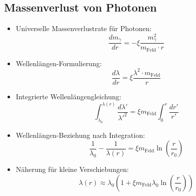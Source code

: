 \documentclass[12pt,a4paper]{article}
\begin{document}
\subsection{Massenverlust von Photonen}
\begin{itemize}
	\item Universelle Massenverlustrate für Photonen:
	\begin{equation}
		\boxed{\frac{dm_\gamma}{dr} = -\xi \frac{m_\gamma^2}{m_{\text{Feld}} \cdot r}}
	\end{equation}
	
	\item Wellenlängen-Formulierung:
	\begin{equation}
		\frac{d\lambda}{dr} = \xi \frac{\lambda^2 \cdot m_{\text{Feld}}}{r}
	\end{equation}
	
	\item Integrierte Wellenlängengleichung:
	\begin{equation}
		\int_{\lambda_0}^{\lambda(r)} \frac{d\lambda'}{\lambda'^2} = \xi m_{\text{Feld}} \int_0^r \frac{dr'}{r'}
	\end{equation}
	
	\item Wellenlängen-Beziehung nach Integration:
	\begin{equation}
		\frac{1}{\lambda_0} - \frac{1}{\lambda(r)} = \xi m_{\text{Feld}} \ln\left(\frac{r}{r_0}\right)
	\end{equation}
	
	\item Näherung für kleine Verschiebungen:
	\begin{equation}
		\lambda(r) \approx \lambda_0 \left(1 + \xi m_{\text{Feld}} \lambda_0 \ln\left(\frac{r}{r_0}\right)\right)
	\end{equation}
\end{itemize}
\end{document}
